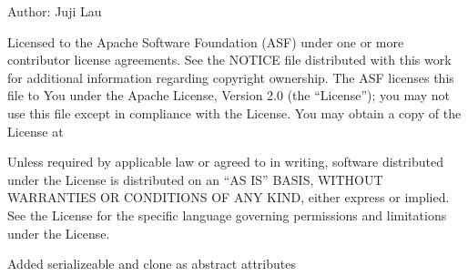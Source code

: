 \documentclass[letterpaper,10pt,english]{sphinxmanual}
\begin{document}
\sphinxAtStartPar
Author: Juji Lau
\begin{description}
\sphinxAtStartPar
Licensed to the Apache Software Foundation (ASF) under one or more
contributor license agreements. See the NOTICE file distributed with
this work for additional information regarding copyright ownership.
The ASF licenses this file to You under the Apache License, Version 2.0
(the “License”); you may not use this file except in compliance with
the License. You may obtain a copy of the License at
\begin{quote}

\sphinxAtStartPar
{}
\end{quote}

\sphinxAtStartPar
Unless required by applicable law or agreed to in writing, software
distributed under the License is distributed on an “AS IS” BASIS,
WITHOUT WARRANTIES OR CONDITIONS OF ANY KIND, either express or implied.
See the License for the specific language governing permissions and
limitations under the License.

\sphinxAtStartPar
Added serializeable and clone as abstract attributes

\end{description}
\end{document}
